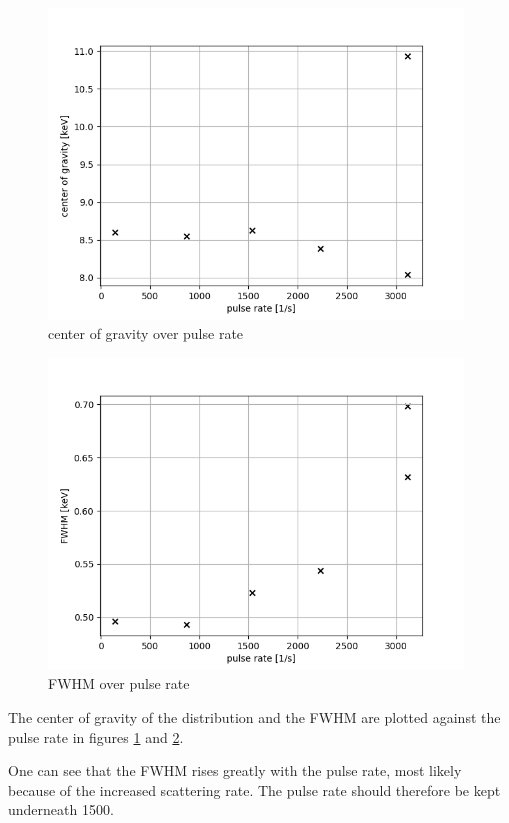\begin{figure}[H]
    
    \centering
    
    \includegraphics[width=110mm,scale=0.5]{MAX/include/cog.png}
    \caption{center of gravity over pulse rate}
    \label{figure:maxcog}
\end{figure}

\begin{figure}[H]
   
    \centering
     
    \includegraphics[width=110mm,scale=0.5]{MAX/include/fwhm.png}
    \caption{FWHM over pulse rate}
    \label{figure:maxFWHM}
\end{figure}
The center of gravity of the distribution and the FWHM are plotted against the pulse rate in figures \ref{figure:maxcog} and \ref{figure:maxFWHM}.


One can see that the FWHM rises greatly with the pulse rate, most likely because of the increased scattering rate. The pulse rate should therefore be kept underneath \SI{1500}{}.
